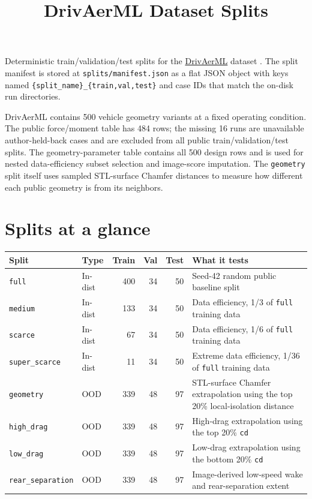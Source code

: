 \documentclass[10pt]{article}
\title{\vspace{-1.2em}\textbf{DrivAerML Dataset Splits}}
\author{}
\date{}
\newcommand{\code}[1]{\texttt{#1}}
\newcommand{\splitkey}[1]{\texttt{#1}}
\begin{document}
\maketitle
\vspace{-2.0em}

Deterministic train/validation/test splits for the
\href{https://huggingface.co/datasets/neashton/drivaerml}{DrivAerML} dataset
\cite{drivaerml_dataset}. The split manifest is stored at
\code{splits/manifest.json} as a flat JSON object with keys named
\code{\{split\_name\}\_\{train,val,test\}} and case IDs that match the on-disk
run directories.

DrivAerML contains 500 vehicle geometry variants at a fixed operating
condition. The public force/moment table has 484 rows; the missing 16 runs are
unavailable author-held-back cases and are excluded from all public
train/validation/test splits. The geometry-parameter table contains all 500
design rows and is used for nested data-efficiency subset selection and
image-score imputation. The \splitkey{geometry} split itself uses sampled
STL-surface Chamfer distances to measure how different each public geometry is
from its neighbors.

\section*{Splits at a glance}

\begin{tabularx}{\textwidth}{@{}l l r r r X@{}}
\toprule
Split & Type & Train & Val & Test & What it tests \\
\midrule
\splitkey{full} & In-dist & 400 & 34 & 50 & Seed-42 random public baseline split \\
\splitkey{medium} & In-dist & 133 & 34 & 50 & Data efficiency, 1/3 of \splitkey{full} training data \\
\splitkey{scarce} & In-dist & 67 & 34 & 50 & Data efficiency, 1/6 of \splitkey{full} training data \\
\splitkey{super\_scarce} & In-dist & 11 & 34 & 50 & Extreme data efficiency, 1/36 of \splitkey{full} training data \\
\splitkey{geometry} & OOD & 339 & 48 & 97 & STL-surface Chamfer extrapolation using the top 20\% local-isolation distance \\
\splitkey{high\_drag} & OOD & 339 & 48 & 97 & High-drag extrapolation using the top 20\% \code{cd} \\
\splitkey{low\_drag} & OOD & 339 & 48 & 97 & Low-drag extrapolation using the bottom 20\% \code{cd} \\
\splitkey{rear\_separation} & OOD & 339 & 48 & 97 & Image-derived low-speed wake and rear-separation extent \\
\bottomrule
\end{tabularx}
\end{document}
